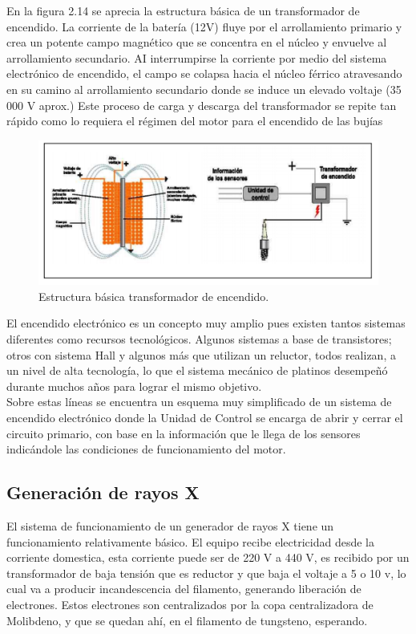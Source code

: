 En la figura 2.14 se aprecia la estructura básica de un transformador
de encendido. La corriente de la batería (12V) fluye por el arrollamiento
primario y crea un potente campo magnético que se concentra en el
núcleo y envuelve al arrollamiento secundario. AI interrumpirse la corriente
por medio del sistema electrónico de encendido, el campo se colapsa
hacia el núcleo férrico atravesando en su camino al arrollamiento
secundario donde se induce un elevado voltaje (35 000 V aprox.) Este
proceso de carga y descarga del transformador se repite tan rápido como
lo requiera el régimen del motor para el encendido de las bujías


\begin{figure}[H]
\centering
\includegraphics[width=12cm]{capitulo3/figs/trans3.png}
\caption{ Estructura básica transformador de encendido.}
\end{figure}

El encendido electrónico es un concepto muy amplio pues existen
tantos sistemas diferentes como recursos tecnológicos. Algunos sistemas
a base de transistores; otros con sistema Hall y algunos más que utilizan
un reluctor, todos realizan, a un nivel de alta tecnología, lo que el sistema
mecánico de platinos desempeñó durante muchos años para lograr el
mismo objetivo.\\

Sobre estas líneas se encuentra un esquema muy simplificado de
un sistema de encendido electrónico donde la Unidad de Control se
encarga de abrir y cerrar el circuito primario, con base en la información
que le llega de los sensores indicándole las condiciones de
funcionamiento del motor. \cite{ignicion}

\subsection{Generación de rayos X}

El sistema de funcionamiento de un generador de rayos X tiene un funcionamiento relativamente básico.  El equipo recibe electricidad desde la corriente domestica, esta corriente puede ser de 220 V a 440 V, es recibido por un transformador de baja tensión que es reductor y que baja el voltaje a 5 o 10 v, lo cual va a producir incandescencia del filamento, generando liberación de electrones. Estos electrones son centralizados por la copa centralizadora de Molibdeno, y que se quedan ahí, en el filamento de tungsteno, esperando. \\

